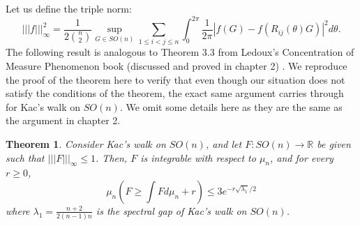 \documentclass[12pt]{report}
\newtheorem{thm}{Theorem}[section]
\newcommand{\reals}{\mathbb{R}}
\newcommand{\tripNorm}[1]{|||#1|||_\infty}
\theoremstyle{definition}
\begin{document}
Let us define the triple norm:
\begin{equation}
	\tripNorm{f}^2 = \frac 1 {2\binom{n}{2}} \sup_{G\in SO(n)}\sum_{1 \leq i<j\leq n} \int_0^{2\pi} \frac{1}{2\pi} \left|f(G) - f(R_{ij}(\theta)G)\right|^2 d\theta.
\end{equation}
The following result is analogous to Theorem 3.3 from Ledoux's Concentration of Measure Phenomenon book \cite{LedouxCOM} (discussed and proved in chapter 2) . We reproduce the proof of the theorem here to verify that even though our situation does not satisfy the conditions of the theorem, the exact same argument carries through for Kac's walk on $SO(n)$. We omit some details here as they are the same as the argument in chapter 2.  
\begin{thm}
	Consider Kac's walk on $SO(n)$, and let $F:SO(n)\to \reals$ be given such that $\tripNorm{F}\leq 1$. Then, $F$ is integrable with respect to $\mu_n$, and for every $r\geq 0$, 
	\begin{equation*}
		\mu_n\left (F \geq \int F d\mu_n + r\right) \leq 3 e^{-r\sqrt{\lambda_1}/2}
	\end{equation*}
	where $\lambda_1= \frac{n+2}{2(n-1)n}$ is the spectral gap of Kac's walk on $SO(n)$.
\end{thm}
\end{document}
